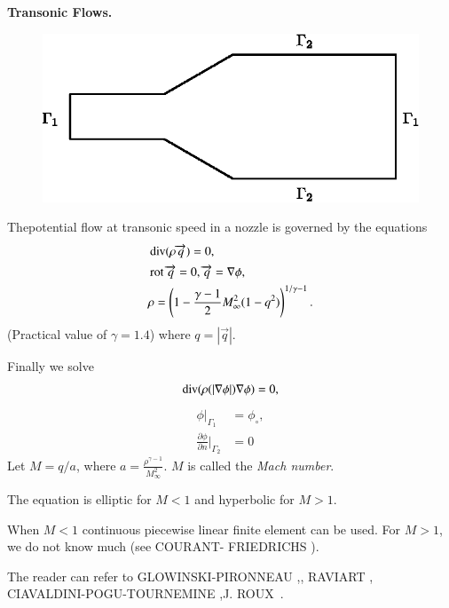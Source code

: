 \begin{exam}\label{chap9:exm9}
{\bf Transonic Flows.}
\begin{figure}[H]
\centering
\includegraphics{figure/fig9.3.eps}
\caption{}\label{fig9.3}
\end{figure}

The\pageoriginale potential flow at transonic speed in a nozzle is
governed by the equations
\begin{align*}
&\operatorname{div}(\rho\overrightarrow{q})=0,\\
&\operatorname{rot} \overrightarrow{q}=0,\overrightarrow{q}=\nabla\phi,\\
&\rho=\left(1-\frac{\gamma-1}{2}M_\infty^2(1-q^2)\right)^{1/\gamma-1}.
\end{align*}
(Practical value of $\gamma=1.4$) where $q=|\overrightarrow{q}|$. 

Finally we solve
$$
\operatorname{div}(\rho(|\nabla\phi|)\nabla\phi)=0,
$$
\begin{align*}
\phi|_{\Gamma_1} &=\phi_\circ,\\
\frac{\partial\phi}{\partial n}|_{\Gamma_2} &=0
\end{align*}
Let $M=q/a$, where $a=\frac{\rho^{\gamma-1}}{M_\infty^2}$. $M$ is called the
\emph{Mach number}.

The equation is elliptic for $M<1$ and hyperbolic for $M>1$.

When $M<1$ continuous piecewise linear finite element can be used. For
$M>1$, we do not know much (see COURANT- FRIEDRICHS \cite{key13}).

The reader can refer to GLOWINSKI-PIRONNEAU \cite{key20},\cite{key21},\break
RAVIART \cite{key36}, CIAVALDINI-POGU-TOURNEMINE \cite{key12},\break J. ROUX~\cite{key40}.
\end{exam}



